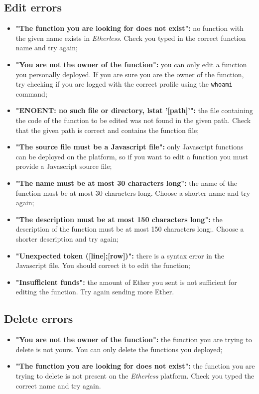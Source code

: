   \subsection{Edit errors}
  \begin{itemize}
   \item \textbf{"The function you are looking for does not exist":} no function with the given name exists in \textit{Etherless}. Check you typed in the correct function name and try again;
    \item \textbf{"You are not the owner of the function":} you can only edit a function you personally deployed. If you are sure you are the owner of the function, try checking if you are logged with the correct profile using the \texttt{whoami} command;
    \item \textbf{"ENOENT: no such file or directory, lstat '[path]'":} the file containing the code of the function to be edited was not found in the given path. Check that the given path is correct and contains the function file;
     \item \textbf{"The source file must be a Javascript file":} only Javascript functions can be deployed on the platform, so if you want to edit a function you must provide a Javascript source file;
    \item \textbf{"The name must be at most 30 characters long":} the name of the function must be at most 30 characters long. Choose a shorter name and try again;
    \item \textbf{"The description must be at most 150 characters long":} the description of the function must be at most 150 characters long;. Choose a shorter description and try again;
    \item \textbf{"Unexpected token ([line];[row])":} there is a syntax error in the Javascript file. You should correct it to edit the function; 
    \item \textbf{"Insufficient funds":} the amount of Ether you sent is not sufficient for editing the function. Try again sending more Ether.
  \end{itemize}
  
  \subsection{Delete errors}
  \begin{itemize}
    \item \textbf{"You are not the owner of the function":} the function you are trying to delete is not yours. You can only delete the functions you deployed;
    \item \textbf{"The function you are looking for does not exist":} the function you are trying to delete is not present on the \textit{Etherless} platform. Check you typed the correct name and try again.
  \end{itemize}
  
